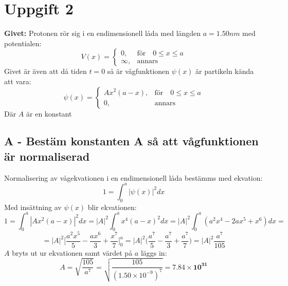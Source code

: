 \documentclass{article}
\begin{document}
  \newpage
  \section*{Uppgift 2}
      \textbf{Givet:} Protonen rör sig i en endimensionell låda med längden $a=1.50nm$ med potentialen:
      \[
        V(x)=
        \begin{cases}
          0,      & \text{för}\quad0\leq x\leq a\\
          \infty, & \text{annars}
        \end{cases}
      \]
      Givet är även att då tiden $t=0$ så är vågfunktionen $\psi(x)$ är partikeln kända att vara:
      \[
        \psi(x)=
        \begin{cases}
          Ax^2(a-x),& \text{för}\quad0\leq x\leq a\\
          0,        & \text{annars}
        \end{cases}
      \]
      Där $A$ är en konstant
      \subsection*{A - Bestäm konstanten A så att vågfunktionen är normaliserad}
        Normalisering av vågekvationen i en endimensionell låda bestämms med ekvation:
        \[
          1=\int_{0}^{a}|\psi(x)|^2dx
        \]
        Med insättning av $\psi(x)$ blir ekvationen:
        \[
          1=\int_{0}^{a}|Ax^2(a-x)|^2dx=|A|^2\int_0^ax^4(a-x)^2dx=|A|^2\int_0^a(a^2x^4-2ax^5+x^6)dx=
        \]
        \[
          =|A|^2\bigg[\frac{a^2x^5}{5}-\frac{ax^6}{3}+\frac{x^7}{7}\bigg]_0^a=|A|^2\bigg(\frac{a^7}{5}-\frac{a^7}{3}+\frac{a^7}{7}\bigg)=|A|^2\frac{a^7}{105}
        \]
        $A$ bryts ut ur ekvationen samt värdet på $a$ läggs in:
        \[
          A=\sqrt{\frac{105}{a^7}}=\sqrt{\frac{105}{(1.50\times10^{-9})^7}}=\mathbf{7.84\times10^{31}}
        \]
\end{document}
